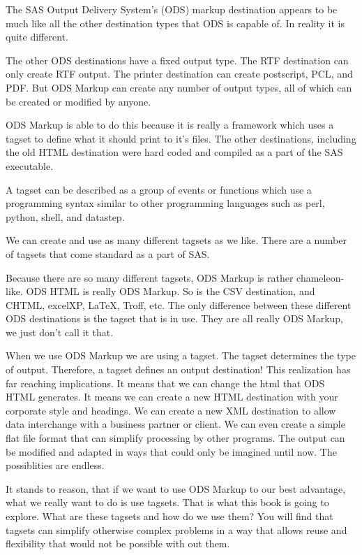 
The SAS Output Delivery System's (ODS) markup destination appears
to be much like all the other destination types that ODS is capable
of.  In reality it is quite different.  

The other ODS destinations have a
fixed output type.  The RTF destination can only create RTF output.
The printer destination can create postscript, PCL, and PDF.  But ODS
Markup can create any number of output types, all of which can be
created or modified by anyone.

ODS Markup is able to do this because it is really a framework which
uses a tagset to define what it should print to it's files.  The other
destinations, including the old HTML destination were hard coded
and compiled as a part of the SAS executable.  

A tagset can be described as a group of events or functions which use
a programming syntax similar to other programming languages such as
perl, python, shell, and datastep. 

We can create and use as many different tagsets as we like.  
There are a number of tagsets that come standard as a part of SAS.

Because there are so many different tagsets, ODS Markup is rather 
chameleon-like.  ODS HTML is really ODS Markup.  So is the CSV 
destination, and CHTML, excelXP, LaTeX, Troff, etc.  The only 
difference between these different ODS destinations is the tagset 
that is in use.  They are all really ODS Markup, we just don't call
it that.
 
When we use ODS Markup we are using a tagset.  The tagset determines
the type of output. Therefore, a tagset defines an output destination!
This realization has far reaching implications.  It means that we
can change the html that ODS HTML generates.  It means we can create
a new HTML destination with your corporate style and headings.  We
can create a new XML destination to allow data interchange with a
business partner or client. We can even create a simple flat file
format that can simplify processing by other programs. The output
can be modified and adapted in ways that could only be imagined until now.
The possiblities are endless.

It stands to reason, that if we want to use ODS Markup to our best
advantage, what we really want to do is use tagsets.  That
is what this book is going to explore.  What are these tagsets and how
do we use them?  You will find that tagsets can simplify otherwise
complex problems in a way that allows reuse and flexibility that
would not be possible with out them.
